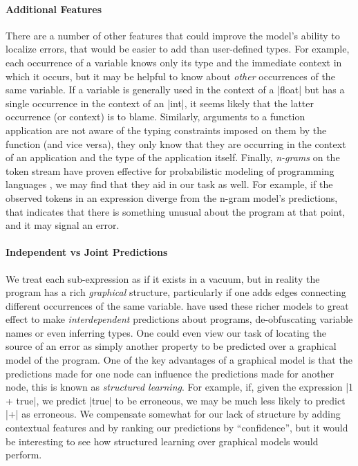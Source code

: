 \paragraph{Additional Features}
There are a number of other features that could improve the model's
ability to localize errors, that would be easier to add than
user-defined types.
%
For example, each occurrence of a variable knows only its type and the
immediate context in which it occurs, but it may be helpful to know
about \emph{other} occurrences of the same variable.
%
If a variable is generally used in the context of a |float| but has a
single occurrence in the context of an |int|, it seems likely that the
latter occurrence (or context) is to blame.
%
Similarly, arguments to a function application are not aware of the
typing constraints imposed on them by the function (and vice versa),
they only know that they are occurring in the context of an application
and the type of the application itself.
%
Finally, \emph{n-grams} on the token stream have proven effective for
probabilistic modeling of programming languages
\citep{Hindle2012-hf,Gabel2010-el}, we may find that they aid in
our task as well.
%
For example, if the observed tokens in an expression diverge from the
n-gram model's predictions, that indicates that there is something
unusual about the program at that point, and it may signal an error.


\paragraph{Independent vs Joint Predictions}
We treat each sub-expression as if it exists in a vacuum, but in reality
the program has a rich \emph{graphical} structure, particularly if one adds
edges connecting different occurrences of the same variable.
%
\citet{Raychev2015-jg} have used these richer models to great effect to
make \emph{interdependent} predictions about programs, \eg
de-obfuscating variable names or even inferring types.
%
One could even view our task of locating the source of an error as simply
another property to be predicted over a graphical model of the program.
%
One of the key advantages of a graphical model is that the predictions
made for one node can influence the predictions made for another node,
this is known as \emph{structured learning}.
%
For example, if, given the expression |1 + true|, we predict |true| to
be erroneous, we may be much less likely to predict |+| as erroneous.
%
We compensate somewhat for our lack of structure by adding contextual
features and by ranking our predictions by ``confidence'', but it would
be interesting to see how structured learning over graphical models
would perform.




